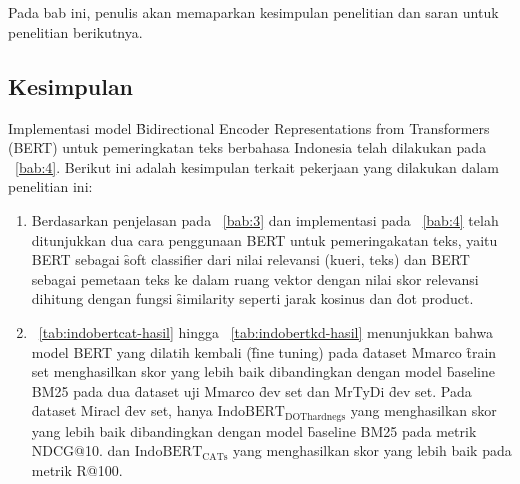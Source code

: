\chapter{\kesimpulan}
\label{bab:6}
Pada bab ini, penulis akan memaparkan kesimpulan penelitian dan saran untuk penelitian berikutnya.


\section{Kesimpulan}
\label{sec:kesimpulan}
Implementasi model \f{Bidirectional Encoder Representations from Transformers} (BERT) untuk pemeringkatan teks berbahasa Indonesia telah dilakukan pada \sect~\ref{bab:4}. Berikut ini adalah kesimpulan terkait pekerjaan yang dilakukan dalam penelitian ini:

\begin{enumerate}
	\item  Berdasarkan penjelasan pada \sect~\ref{bab:3} dan implementasi pada \sect~\ref{bab:4} telah ditunjukkan dua cara penggunaan BERT untuk pemeringakatan teks, yaitu BERT sebagai \f{soft classifier} dari nilai relevansi (kueri, teks) dan BERT sebagai pemetaan teks ke dalam ruang vektor dengan nilai skor relevansi dihitung dengan fungsi \f{similarity} seperti jarak kosinus dan \f{dot product}.
	\item \tab~\ref{tab:indobertcat-hasil} hingga \tab~\ref{tab:indobertkd-hasil} menunjukkan bahwa model BERT yang dilatih kembali (\f{fine tuning}) pada \f{dataset} Mmarco \f{train set} menghasilkan skor yang lebih baik dibandingkan dengan model \f{baseline} BM25 pada dua \f{dataset} uji Mmarco \f{dev set} dan MrTyDi \f{dev set}. Pada \f{dataset} Miracl \f{dev set}, hanya $\text{IndoBERT}_{\text{DOThardnegs}}$ yang menghasilkan skor yang lebih baik dibandingkan dengan model \f{baseline} BM25 pada metrik NDCG@10. dan $\text{IndoBERT}_{\text{CATs}}$ yang menghasilkan skor yang lebih baik pada metrik R@100.
\end{enumerate}

